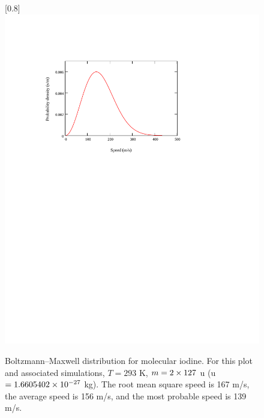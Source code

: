 \begin{figure}
\scalebox{0.8}[0.8]{
\includegraphics[bb=0 470 489 675]
{Boltzmann-Maxwell/Boltzmann-Maxwell.pdf}
}
\caption[Boltzmann-Maxwell distribution for molecular iodine]{Boltzmann--Maxwell distribution for molecular iodine. For this plot and associated simulations, $T=293$ K, $m = 2 \times 127$ u (u $= 1.6605402\times10^{-27}$ kg). The root mean square speed is 167 m/s, the average speed is 156 m/s, and the most probable speed is 139 m/s.}
\label{Boltzmann-Maxwell}
\end{figure}
